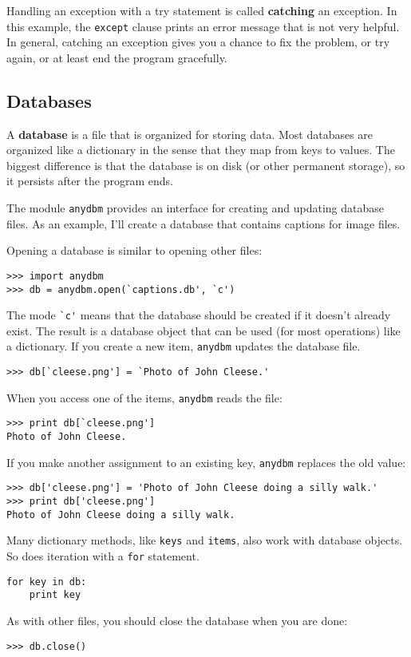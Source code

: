 \documentclass{article}
\begin{document}
\begin{multicols}{2}
Handling an exception with a try statement is called \textbf{catching} an
exception. In this example, the \verb|except| clause prints an error message
that is not very helpful. In general, catching an exception gives you
a chance to fix the problem, or try again, or at least end the program
gracefully.

\subsection{Databases}
A \textbf{database} is a file that is organized for storing data. Most
databases are organized like a dictionary in the sense that they map
from keys to values. The biggest difference is that the database is on
disk (or other permanent storage), so it persists after the program
ends.

The module \verb|anydbm| provides an interface for creating and
updating database files. As an example, I'll create a database that
contains captions for image files.

Opening a database is similar to opening other files:
\begin{lstlisting}
>>> import anydbm
>>> db = anydbm.open(`captions.db', `c')
\end{lstlisting}
The mode \verb|`c'| means that the database should be created if it
doesn't already exist. The result is a database object that can be
used (for most operations) like a dictionary. If you create a new
item, \verb|anydbm| updates the database file.
\begin{lstlisting}
>>> db[`cleese.png'] = `Photo of John Cleese.'
\end{lstlisting}
When you access one of the items, \verb|anydbm| reads the file:
\begin{lstlisting}
>>> print db[`cleese.png']
Photo of John Cleese.
\end{lstlisting}
If you make another assignment to an existing key, \verb|anydbm|
replaces the old value:
\begin{lstlisting}
>>> db['cleese.png'] = 'Photo of John Cleese doing a silly walk.'
>>> print db['cleese.png']
Photo of John Cleese doing a silly walk.
\end{lstlisting}
Many dictionary methods, like \verb|keys| and \verb|items|, also work
with database objects. So does iteration with a \verb|for| statement.
\begin{lstlisting}
for key in db:
    print key
\end{lstlisting}
As with other files, you should close the database when you are done:
\begin{lstlisting}
>>> db.close()
\end{lstlisting}


\end{multicols}
\end{document}
